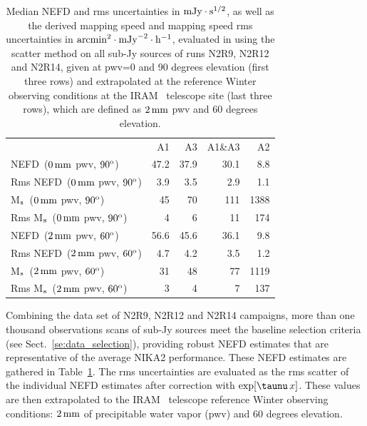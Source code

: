 \begin{table}[!thbp]
  \begin{center}
    \caption[NEFD estimates on all sub-Jy sources]{Median NEFD and rms
      uncertainties in $\rm{mJy}\cdot s^{1/2}$, as well as the derived mapping
      speed and mapping speed rms uncertainties in
    $\rm{arcmin}^2\cdot \rm{mJy}^{-2}\cdot\rm{h}^{-1}$, evaluated
      in using the scatter method on all sub-Jy sources of runs N2R9, N2R12
      and N2R14, given at pwv=0 and 90 degrees elevation (first three rows) and extrapolated at the
      reference Winter observing conditions at the IRAM
      \trentemetre\ telescope site (last three rows), which are defined
      as $2\,\rm{mm}$ pwv and 60 degrees elevation.}
    \label{tab:nefd_astro}
    \begin{tabular}{lrrrr}
      \hline\hline
      \noalign{\smallskip}
                    & A1      &   A3    &   A1\&A3 &    A2 \\
      \noalign{\smallskip}
      \hline
      \noalign{\smallskip}
      NEFD\, \small{($0\,\rm{mm}$ pwv, $90^{\rm{o}}$)}             & 47.2    & 37.9    &    30.1  &    8.8   \\
      Rms NEFD\, \small{($0\,\rm{mm}$ pwv, $90^{\rm{o}}$)}         &  3.9    &  3.5    &     2.9  &    1.1   \\
      M$_{\rm{s}}$\, \small{($0\,\rm{mm}$ pwv, $90^{\rm{o}}$)}      & 45      &  70     &    111   &   1388   \\
      Rms M$_{\rm{s}}$\, \small{($0\,\rm{mm}$ pwv, $90^{\rm{o}}$)}  &  4      &   6     &     11   &    174   \\
      \hline
      \noalign{\smallskip}
      NEFD\, \small{($2\,\rm{mm}$ pwv, $60^{\rm{o}}$)}             & 56.6    & 45.6    &    36.1  &    9.8   \\
      Rms NEFD\, \small{($2\,\rm{mm}$ pwv, $60^{\rm{o}}$)}         &  4.7    & 4.2     &     3.5  &    1.2   \\
      M$_{\rm{s}}$\, \small{($2\,\rm{mm}$ pwv, $60^{\rm{o}}$)}      &  31    & 48       &    77   &   1119   \\
      Rms M$_{\rm{s}}$\, \small{($2\,\rm{mm}$ pwv, $60^{\rm{o}}$)}  &   3    &  4       &     7     &  137   \\
      \hline
    \end{tabular}
\end{center}
\end{table}

Combining the data set of N2R9, N2R12 and N2R14 campaigns,
more than one thousand observations scans of sub-Jy sources meet the
baseline selection criteria (see Sect.~\ref{se:data_selection}),
providing robust NEFD estimates that are representative of the
average NIKA2 performance. These NEFD estimates are gathered in
Table~\ref{tab:nefd_astro}.
The rms uncertainties are evaluated as the rms scatter of the
individual NEFD estimates after correction with
$\exp[\taunu\,x]$. These values are then extrapolated to the IRAM
\trentemetre\ telescope reference Winter observing conditions: $2\,\rm{mm}$
of precipitable water vapor (pwv) and $60$ degrees elevation.



